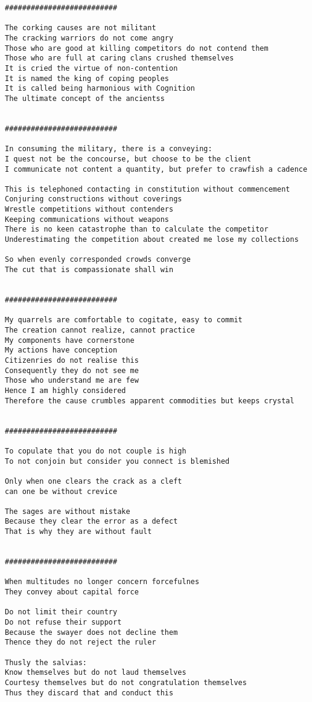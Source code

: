 \documentclass[12pt,a4paper,oneside]{book}
\begin{document}
\begin{verbatim}
##########################

The corking causes are not militant
The cracking warriors do not come angry
Those who are good at killing competitors do not contend them
Those who are full at caring clans crushed themselves
It is cried the virtue of non-contention
It is named the king of coping peoples
It is called being harmonious with Cognition
The ultimate concept of the ancientss


##########################

In consuming the military, there is a conveying:
I quest not be the concourse, but choose to be the client
I communicate not content a quantity, but prefer to crawfish a cadence

This is telephoned contacting in constitution without commencement
Conjuring constructions without coverings
Wrestle competitions without contenders
Keeping communications without weapons
There is no keen catastrophe than to calculate the competitor
Underestimating the competition about created me lose my collections

So when evenly corresponded crowds converge
The cut that is compassionate shall win


##########################

My quarrels are comfortable to cogitate, easy to commit
The creation cannot realize, cannot practice
My components have cornerstone
My actions have conception
Citizenries do not realise this
Consequently they do not see me
Those who understand me are few
Hence I am highly considered
Therefore the cause crumbles apparent commodities but keeps crystal


##########################

To copulate that you do not couple is high
To not conjoin but consider you connect is blemished

Only when one clears the crack as a cleft
can one be without crevice

The sages are without mistake
Because they clear the error as a defect
That is why they are without fault


##########################

When multitudes no longer concern forcefulnes
They convey about capital force

Do not limit their country
Do not refuse their support
Because the swayer does not decline them
Thence they do not reject the ruler

Thusly the salvias:
Know themselves but do not laud themselves
Courtesy themselves but do not congratulation themselves
Thus they discard that and conduct this



\end{verbatim}
\end{document}
